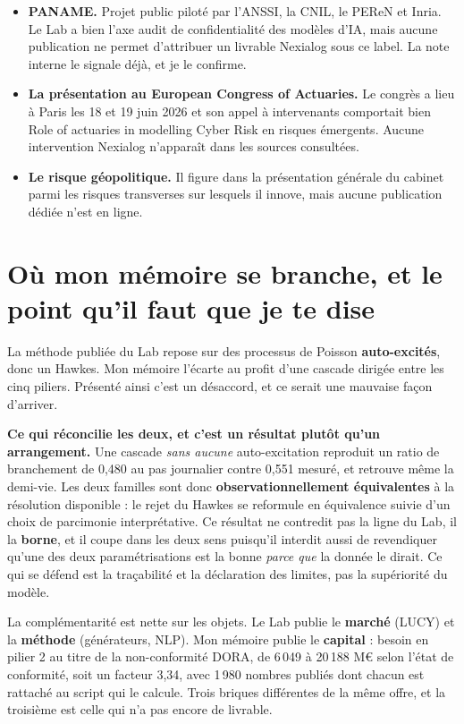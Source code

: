 \documentclass[11pt,a4paper]{article}
\newcommand{\encadre}[2]{%
  \vspace{3pt}\noindent\colorbox{grisclair}{%
  \begin{minipage}{\dimexpr\textwidth-2\fboxsep}
  \small\textbf{#1} #2
  \end{minipage}}\vspace{4pt}}
\begin{document}
\begin{itemize}
\item \textbf{PANAME.} Projet public piloté par l'ANSSI, la CNIL, le PEReN et Inria. Le Lab a
      bien l'axe \og{}audit de confidentialité des modèles d'IA\fg{}, mais aucune publication ne
      permet d'attribuer un livrable Nexialog sous ce label. La note interne le signale déjà,
      et je le confirme.
\item \textbf{La présentation au European Congress of Actuaries.} Le congrès a lieu à Paris les
      18 et 19 juin 2026 et son appel à intervenants comportait bien \og{}Role of actuaries in
      modelling Cyber Risk\fg{} en risques émergents. Aucune intervention Nexialog n'apparaît
      dans les sources consultées.
\item \textbf{Le risque géopolitique.} Il figure dans la présentation générale du cabinet parmi
      les risques transverses sur lesquels il innove, mais aucune publication dédiée n'est en
      ligne.
\end{itemize}

\section{Où mon mémoire se branche, et le point qu'il faut que je te dise}

La méthode publiée du Lab repose sur des processus de Poisson \textbf{auto-excités}, donc un
Hawkes. Mon mémoire l'écarte au profit d'une cascade dirigée entre les cinq piliers. Présenté
ainsi c'est un désaccord, et ce serait une mauvaise façon d'arriver.

\encadre{Ce qui réconcilie les deux, et c'est un résultat plutôt qu'un arrangement.}{Une cascade
\emph{sans aucune} auto-excitation reproduit un ratio de branchement de 0,480 au pas journalier
contre 0,551 mesuré, et retrouve même la demi-vie. Les deux familles sont donc
\textbf{observationnellement équivalentes} à la résolution disponible : le rejet du Hawkes se
reformule en équivalence suivie d'un choix de parcimonie interprétative. Ce résultat ne
contredit pas la ligne du Lab, il la \textbf{borne}, et il coupe dans les deux sens puisqu'il
interdit aussi de revendiquer qu'une des deux paramétrisations est la bonne \emph{parce que} la
donnée le dirait. Ce qui se défend est la traçabilité et la déclaration des limites, pas la
supériorité du modèle.}

La complémentarité est nette sur les objets. Le Lab publie le \textbf{marché} (LUCY) et la
\textbf{méthode} (générateurs, NLP). Mon mémoire publie le \textbf{capital} : besoin en pilier 2
au titre de la non-conformité DORA, de 6\,049 à 20\,188 M\euro{} selon l'état de conformité, soit
un facteur 3,34, avec 1\,980 nombres publiés dont chacun est rattaché au script qui le calcule.
Trois briques différentes de la même offre, et la troisième est celle qui n'a pas encore de
livrable.
\end{document}
